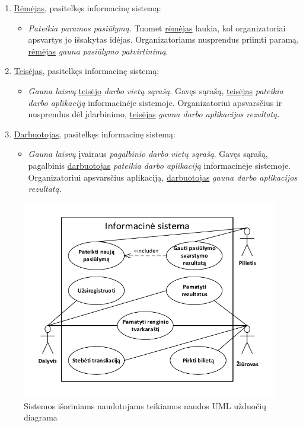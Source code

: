 \documentclass{VUMIFPSkursinis}
\begin{document}
      \begin{enumerate}
        \item \underline{Rėmėjas}, pasitelkęs informacinę sistemą:
          \begin{itemize}
            \item \textit{Pateikia paramos pasiūlymą}. Tuomet \underline{rėmėjas} laukia, kol organizatoriai apsvartys jo išsakytas
                  idėjas. Organizatoriams nusprendus priimti paramą, \underline{rėmėjas} \textit{gauna pasiūlymo patvirtinimą}.
          \end{itemize}
        \item \underline{Teisėjas}, pasitelkęs informacinę sistemą:
          \begin{itemize}
            \item \textit{Gauna laisvų} \underline{teisėjo} \textit{darbo vietų sąrašą}. Gavęs sąrašą, \underline{teisėjas}
                  \textit{pateikia darbo aplikaciją} informacinėje sistemoje. Organizatoriui apsvarsčius ir nusprendus dėl
                  įdarbinimo, \underline{teisėjas} \textit{gauna darbo aplikacijos rezultatą}.
          \end{itemize}
        \item \underline{Darbuotojas}, pasitelkęs informacinę sistemą:
          \begin{itemize}
            \item \textit{Gauna laisvų} įvairaus \textit{pagalbinio darbo vietų sąrašą}. Gavęs sąrašą, pagalbinis \underline{darbuotojas}
                  \textit{pateikia darbo aplikaciją} informacinėje sistemoje. Organizatoriui apsvarsčius aplikaciją, \underline{darbuotojas}
                  \textit{gauna darbo aplikacijos rezultatą}.
          \end{itemize}
      \end{enumerate}
      
	    \begin{figure}[H]
        \centering
        \includegraphics[width=\textwidth]{img/ScenarijausUzduociuDiagrama3}
        \caption{Sistemos išoriniams naudotojams teikiamos naudos UML užduočių diagrama}
        \label{fig:scenarijusIsoresNaudotojuUzduociuDiagrama}
      \end{figure}
\end{document}

